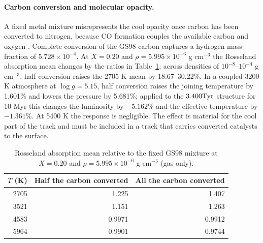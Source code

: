\paragraph{Carbon conversion and molecular opacity.}
A fixed metal mixture misrepresents the cool opacity once carbon has been
converted to nitrogen, because CO formation couples the available carbon and
oxygen \cite{lederer09}. Complete conversion of the GS98 carbon captures a
hydrogen mass fraction of $5.728\times10^{-4}$. At $X=0.20$ and
$\rho=5.995\times10^{-6}$ g cm$^{-3}$ the Rosseland absorption mean changes
by the ratios in Table~\ref{tab:cn}; across densities of
$10^{-8}$--$10^{-4}$ g cm$^{-3}$, half conversion raises the 2705 K mean by
18.67--30.22\%. In a coupled 3200 K atmosphere at $\log g=5.15$, half
conversion raises the joining temperature by 1.601\% and lowers the pressure
by 5.681\%; applied to the $3.400\mathrm{Tyr}$ structure for 10 Myr this changes
the luminosity by $-5.162\%$ and the effective temperature by $-1.361\%$. At
5400 K the response is negligible. The effect is material for the cool
part of the track and must be included in a track that carries converted
catalysts to the surface.

\begin{table}[H]\centering\small
\caption{Rosseland absorption mean relative to the fixed GS98 mixture at
$X=0.20$ and $\rho=5.995\times10^{-6}$ g cm$^{-3}$ (gas only).}\label{tab:cn}
\begin{tabular}{@{}rrr@{}}\toprule
$T$ (K) & Half the carbon converted & All the carbon converted \\\midrule
2705 & 1.225 & 1.407 \\
3521 & 1.151 & 1.263 \\
4583 & 0.9971 & 0.9912 \\
5964 & 0.9901 & 0.9744 \\\bottomrule
\end{tabular}
\end{table}


